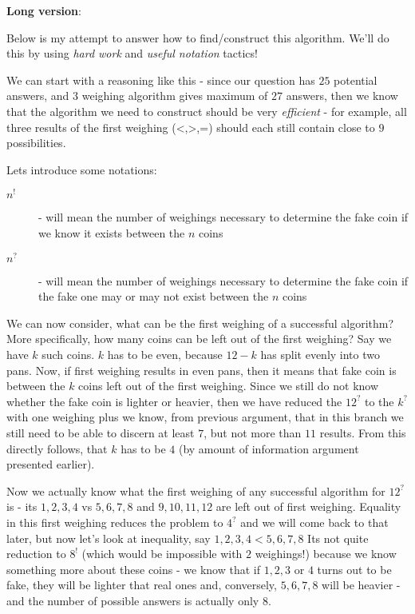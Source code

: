 \begin{problem}
\textbf{Long version}:

Below is my attempt to answer how to find/construct this algorithm. We'll do this by using \textit{hard work} and \textit{useful notation} tactics! 

We can start with a reasoning like this - since our question has $25$ potential answers, and $3$ weighing algorithm gives maximum of $27$ answers, then we know that the algorithm we need to construct should be very \textit{efficient} - for example, all three results of the first weighing (<,>,=) should each still contain close to $9$ possibilities.  

Lets introduce some notations:
\begin{description}
\item[$n^!$] - will mean the number of weighings necessary to determine the fake coin if we know it exists between the $n$ coins
\item[$n^?$] - will mean the number of weighings necessary to determine the fake coin if the fake one may or may not exist between the $n$ coins
\end{description}

We can now consider, what can be the first weighing of a successful algorithm? More specifically, how many coins can be left out of the first weighing? Say we have $k$ such coins. $k$ has to be even, because $12-k$ has split evenly into two pans.  
Now, if first weighing results in even pans, then it means that fake coin is between the $k$ coins left out of the first weighing. Since we still do not know whether the fake coin is lighter or heavier, then we have 
	reduced the $12^?$ to the $k^?$ with one weighing plus we know, from previous argument, that in this branch we still need to be able to discern at least $7$, but not more than $11$ results. From this directly follows, that $k$ has to be $4$ (by amount of information argument presented earlier).
	
Now we actually know what the first weighing of any successful algorithm for $12^?$ is - its $1,2,3,4$ vs $5,6,7,8$ and $9,10,11,12$ are left out of first weighing. Equality in this first weighing reduces the problem to $4^?$ and we will come back to that later, but now let's look at inequality, say $1,2,3,4<5,6,7,8$ 
Its not quite reduction to $8^!$ (which would be impossible with $2$ weighings!) because we know something more about these coins - we know that if $1,2,3$ or $4$ turns out to be fake, they will be lighter that real ones and, conversely, $5,6,7,8$ will be heavier - and the number of possible answers is actually only $8$.


\end{problem}
